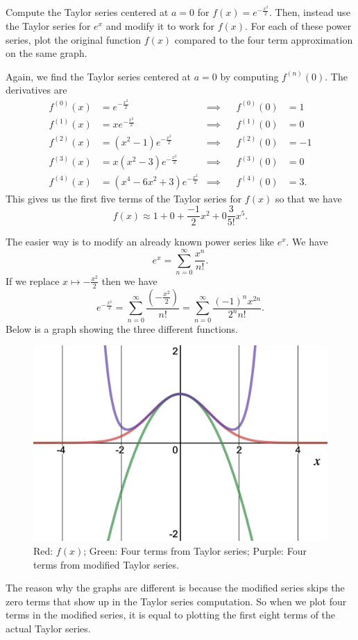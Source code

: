 \documentclass[12pt]{article} %
\begin{document}
\newpage
\begin{problem} 
Compute the Taylor series centered at $a=0$ for $f(x)=e^{-\frac{x^2}{2}}$. Then, instead use the Taylor series for $e^x$ and modify it to work for $f(x)$.  For each of these power series, plot the original function $f(x)$ compared to the four term approximation on the same graph.
\end{problem}
\begin{solution}
Again, we find the Taylor series centered at $a=0$ by computing $f^{(n)}(0)$. The derivatives are
    \begin{align*}
        f^{(0)}(x) &= e^{-\frac{x^2}{2}} &\implies&& f^{(0)}(0)&=1\\
        f^{(1)}(x) &= xe^{-\frac{x^2}{2}} &\implies&& f^{(1)}(0)&=0\\
        f^{(2)}(x) &= (x^2-1)e^{-\frac{x^2}{2}} &\implies&& f^{(2)}(0)&=-1\\
        f^{(3)}(x) &= x(x^2-3)e^{-\frac{x^2}{2}} &\implies&& f^{(3)}(0)&=0\\
        f^{(4)}(x) &= (x^4-6x^2+3)e^{-\frac{x^2}{2}} &\implies&& f^{(4)}(0)&=3.
    \end{align*}
    This gives us the first five terms of the Taylor series for $f(x)$ so that we have
    \[
    f(x)\approx 1 + 0 + \frac{-1}{2}x^2 + 0 \frac{3}{5!}x^5.
    \]
    
    The easier way is to modify an already known power series like $e^x$. We have
    \[
    e^x = \sum_{n=0}^\infty \frac{x^n}{n!}.
    \]
    If we replace $x\mapsto -\frac{x^2}{2}$ then we have
    \[
    e^{-\frac{x^2}{2}} = \sum_{n=0}^\infty \frac{ \left( -\frac{x^2}{2}\right)}{n!} = \sum_{n=0}^\infty \frac{(-1)^n x^{2n}}{2^n n!}.
    \]
    Below is a graph showing the three different functions.
    \begin{figure}[H]
        \centering
        \includegraphics[width=.8\textwidth]{desmos-graph(4).png}
        \caption{Red: $f(x)$; Green: Four terms from Taylor series; Purple: Four terms from modified Taylor series.}
        \label{fig:my_label}
    \end{figure}
    \begin{remark}
    The reason why the graphs are different is because the modified series skips the zero terms that show up in the Taylor series computation. So when we plot four terms in the modified series, it is equal to plotting the first eight terms of the actual Taylor series.
    \end{remark}
\end{solution}
\end{document}

